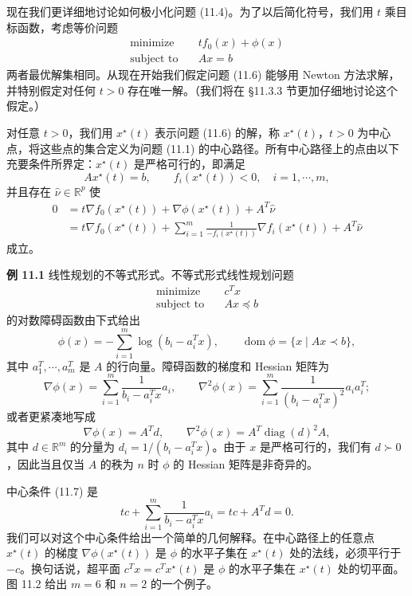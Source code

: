 \documentclass[UTF8, 12pt, fontset=fandol, oneside]{ctexart}
\begin{document}
现在我们更详细地讨论如何极小化问题 (11.4)。为了以后简化符号，我们用 $t$ 乘目标函数，考虑等价问题
\begin{equation}
\begin{aligned}
\text{minimize}\quad & tf_0(x)+\phi(x)\\
\text{subject to}\quad & Ax=b
\end{aligned}
\tag{11.6}
\end{equation}
两者最优解集相同。从现在开始我们假定问题 (11.6) 能够用 Newton 方法求解，并特别假定对任何 $t>0$ 存在唯一解。（我们将在 \S11.3.3 节更加仔细地讨论这个假定。）

对任意 $t>0$，我们用 $x^\star(t)$ 表示问题 (11.6) 的解，称 $x^\star(t)$，$t>0$ 为中心点，将这些点的集合定义为问题 (11.1) 的中心路径。所有中心路径上的点由以下充要条件所界定：$x^\star(t)$ 是严格可行的，即满足
\[
Ax^\star(t)=b,\qquad f_i(x^\star(t))<0,\quad i=1,\cdots,m,
\]
并且存在 $\hat{\nu}\in\mathbb{R}^p$ 使
\begin{equation}
\begin{aligned}
0&=t\nabla f_0(x^\star(t))+\nabla\phi(x^\star(t))+A^T\hat{\nu}\\
&=t\nabla f_0(x^\star(t))+\sum_{i=1}^m\frac{1}{-f_i(x^\star(t))}\nabla f_i(x^\star(t))+A^T\hat{\nu}
\end{aligned}
\tag{11.7}
\end{equation}
成立。

\noindent\textbf{例 11.1}\quad
线性规划的不等式形式。不等式形式线性规划问题
\begin{equation}
\begin{aligned}
\text{minimize}\quad & c^Tx\\
\text{subject to}\quad & Ax\preceq b
\end{aligned}
\tag{11.8}
\end{equation}
的对数障碍函数由下式给出
\[
\phi(x)=-\sum_{i=1}^m\log(b_i-a_i^Tx),\qquad \operatorname{dom}\phi=\{x\mid Ax\prec b\},
\]
其中 $a_1^T,\cdots,a_m^T$ 是 $A$ 的行向量。障碍函数的梯度和 Hessian 矩阵为
\[
\nabla\phi(x)=\sum_{i=1}^m\frac{1}{b_i-a_i^Tx}a_i,\qquad
\nabla^2\phi(x)=\sum_{i=1}^m\frac{1}{(b_i-a_i^Tx)^2}a_ia_i^T;
\]
或者更紧凑地写成
\[
\nabla\phi(x)=A^Td,\qquad \nabla^2\phi(x)=A^T\operatorname{diag}(d)^2A,
\]
其中 $d\in\mathbb{R}^m$ 的分量为 $d_i=1/(b_i-a_i^Tx)$。由于 $x$ 是严格可行的，我们有 $d\succ 0$，因此当且仅当 $A$ 的秩为 $n$ 时 $\phi$ 的 Hessian 矩阵是非奇异的。

中心条件 (11.7) 是
\begin{equation}
tc+\sum_{i=1}^m\frac{1}{b_i-a_i^Tx}a_i=tc+A^Td=0.
\tag{11.9}
\end{equation}
我们可以对这个中心条件给出一个简单的几何解释。在中心路径上的任意点 $x^\star(t)$ 的梯度 $\nabla\phi(x^\star(t))$ 是 $\phi$ 的水平子集在 $x^\star(t)$ 处的法线，必须平行于 $-c$。换句话说，超平面 $c^Tx=c^Tx^\star(t)$ 是 $\phi$ 的水平子集在 $x^\star(t)$ 处的切平面。图 11.2 给出 $m=6$ 和 $n=2$ 的一个例子。
\end{document}

